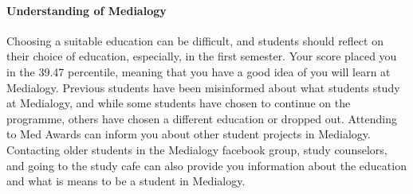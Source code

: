\documentclass[]{article}
\let\oldparagraph\paragraph
\renewcommand{\paragraph}[1]{\oldparagraph{#1}\mbox{}}
\begin{document}
\paragraph{Understanding of Medialogy}\label{understanding-of-medialogy}

Choosing a suitable education can be difficult, and students should
reflect on their choice of education, especially, in the first semester.
Your score placed you in the 39.47 percentile, meaning that you have a
good idea of you will learn at Medialogy. Previous students have been
misinformed about what students study at Medialogy, and while some
students have chosen to continue on the programme, others have chosen a
different education or dropped out. Attending to Med Awards can inform
you about other student projects in Medialogy. Contacting older students
in the Medialogy facebook group, study counselors, and going to the
study cafe can also provide you information about the education and what
is means to be a student in Medialogy.
\end{document}
